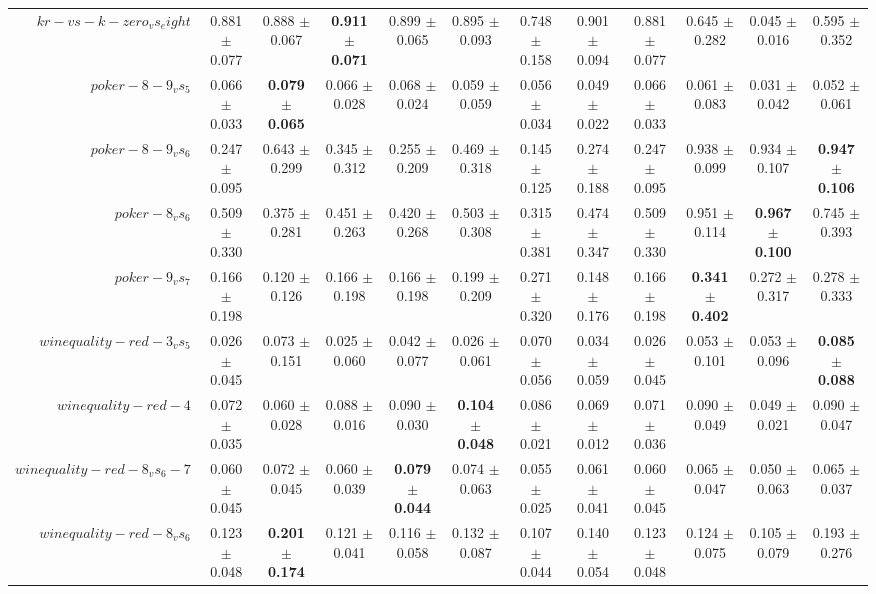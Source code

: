 \begin{table}[!ht]
{\begin{tabular}{r c c c c c c c c c c c}
$kr-vs-k-zero_vs_eight$ & 0.881 $\pm$ 0.077 & 0.888 $\pm$ 0.067 & \textbf{0.911 $\pm$ 0.071} & 0.899 $\pm$ 0.065 & 0.895 $\pm$ 0.093 & 0.748 $\pm$ 0.158 & 0.901 $\pm$ 0.094 & 0.881 $\pm$ 0.077 & 0.645 $\pm$ 0.282 & 0.045 $\pm$ 0.016 & 0.595 $\pm$ 0.352 \\
$poker-8-9_vs_5$ & 0.066 $\pm$ 0.033 & \textbf{0.079 $\pm$ 0.065} & 0.066 $\pm$ 0.028 & 0.068 $\pm$ 0.024 & 0.059 $\pm$ 0.059 & 0.056 $\pm$ 0.034 & 0.049 $\pm$ 0.022 & 0.066 $\pm$ 0.033 & 0.061 $\pm$ 0.083 & 0.031 $\pm$ 0.042 & 0.052 $\pm$ 0.061 \\
$poker-8-9_vs_6$ & 0.247 $\pm$ 0.095 & 0.643 $\pm$ 0.299 & 0.345 $\pm$ 0.312 & 0.255 $\pm$ 0.209 & 0.469 $\pm$ 0.318 & 0.145 $\pm$ 0.125 & 0.274 $\pm$ 0.188 & 0.247 $\pm$ 0.095 & 0.938 $\pm$ 0.099 & 0.934 $\pm$ 0.107 & \textbf{0.947 $\pm$ 0.106} \\
$poker-8_vs_6$ & 0.509 $\pm$ 0.330 & 0.375 $\pm$ 0.281 & 0.451 $\pm$ 0.263 & 0.420 $\pm$ 0.268 & 0.503 $\pm$ 0.308 & 0.315 $\pm$ 0.381 & 0.474 $\pm$ 0.347 & 0.509 $\pm$ 0.330 & 0.951 $\pm$ 0.114 & \textbf{0.967 $\pm$ 0.100} & 0.745 $\pm$ 0.393 \\
$poker-9_vs_7$ & 0.166 $\pm$ 0.198 & 0.120 $\pm$ 0.126 & 0.166 $\pm$ 0.198 & 0.166 $\pm$ 0.198 & 0.199 $\pm$ 0.209 & 0.271 $\pm$ 0.320 & 0.148 $\pm$ 0.176 & 0.166 $\pm$ 0.198 & \textbf{0.341 $\pm$ 0.402} & 0.272 $\pm$ 0.317 & 0.278 $\pm$ 0.333 \\
$winequality-red-3_vs_5$ & 0.026 $\pm$ 0.045 & 0.073 $\pm$ 0.151 & 0.025 $\pm$ 0.060 & 0.042 $\pm$ 0.077 & 0.026 $\pm$ 0.061 & 0.070 $\pm$ 0.056 & 0.034 $\pm$ 0.059 & 0.026 $\pm$ 0.045 & 0.053 $\pm$ 0.101 & 0.053 $\pm$ 0.096 & \textbf{0.085 $\pm$ 0.088} \\
$winequality-red-4$ & 0.072 $\pm$ 0.035 & 0.060 $\pm$ 0.028 & 0.088 $\pm$ 0.016 & 0.090 $\pm$ 0.030 & \textbf{0.104 $\pm$ 0.048} & 0.086 $\pm$ 0.021 & 0.069 $\pm$ 0.012 & 0.071 $\pm$ 0.036 & 0.090 $\pm$ 0.049 & 0.049 $\pm$ 0.021 & 0.090 $\pm$ 0.047 \\
$winequality-red-8_vs_6-7$ & 0.060 $\pm$ 0.045 & 0.072 $\pm$ 0.045 & 0.060 $\pm$ 0.039 & \textbf{0.079 $\pm$ 0.044} & 0.074 $\pm$ 0.063 & 0.055 $\pm$ 0.025 & 0.061 $\pm$ 0.041 & 0.060 $\pm$ 0.045 & 0.065 $\pm$ 0.047 & 0.050 $\pm$ 0.063 & 0.065 $\pm$ 0.037 \\
$winequality-red-8_vs_6$ & 0.123 $\pm$ 0.048 & \textbf{0.201 $\pm$ 0.174} & 0.121 $\pm$ 0.041 & 0.116 $\pm$ 0.058 & 0.132 $\pm$ 0.087 & 0.107 $\pm$ 0.044 & 0.140 $\pm$ 0.054 & 0.123 $\pm$ 0.048 & 0.124 $\pm$ 0.075 & 0.105 $\pm$ 0.079 & 0.193 $\pm$ 0.276 \\

\end{tabular}}
\end{table}
